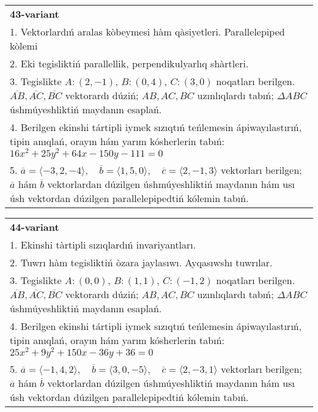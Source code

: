 \documentclass{article}
\begin{document}
\begin{tabular}{m{17cm}}
\textbf{43-variant}\\
1. Vektorlardıń aralas kòbeymesi hàm qàsiyetleri. Parallelepiped kòlemi\\

2. Eki tegisliktiń parallellik, perpendikulyarlıq shàrtleri.\\

3. Tegislikte $A: (2, -1)$, $B: (0, 4)$, $C: (3, 0)$ noqatları berilgen. $\overline{AB}, \overline{AC}, \overline{BC}$ vektorardı dúziń; $AB, AC, BC$ uzınlıqlardı tabıń; $\Delta ABC$ úshmúyeshliktiń maydanın esaplań. \\

4. Berilgen ekinshi tártipli iymek sızıqtıń teńlemesin ápiwayılastırıń, tipin anıqlań, orayın hám yarım kósherlerin tabıń: $16x^2+25y^2+64x-150y-111=0$\\

5. \(\overline{a} = \langle -3, 2, -4 \rangle, \quad \overline{b} = \langle 1, 5, 0 \rangle, \quad \overline{c} = \langle 2, -1, 3 \rangle\) vektorları berilgen; \(\overline{a}\) hám \(\overline{b}\) vektorlardan dúzilgen úshmúyeshliktiń maydanın hám usı úsh vektordan dúzilgen parallelepipedtiń kólemin tabıń.
\end{tabular}
\vspace{1cm}


\begin{tabular}{m{17cm}}
\textbf{44-variant}\\
1. Ekinshi tàrtipli sızıqlardıń invariyantları.\\

2. Tuwrı hàm tegisliktiń òzara jaylasıwı. Ayqasıwshı tuwrılar.\\

3. Tegislikte $A: (0, 0)$, $B: (1, 1)$, $C: (-1, 2)$ noqatları berilgen. $\overline{AB}, \overline{AC}, \overline{BC}$ vektorardı dúziń; $AB, AC, BC$ uzınlıqlardı tabıń; $\Delta ABC$ úshmúyeshliktiń maydanın esaplań. \\

4. Berilgen ekinshi tártipli iymek sızıqtıń teńlemesin ápiwayılastırıń, tipin anıqlań, orayın hám yarım kósherlerin tabıń: $25x^2+9y^2+150x-36y+36=0$\\

5. \(\overline{a} = \langle -1, 4, 2 \rangle, \quad \overline{b} = \langle 3, 0, -5 \rangle, \quad \overline{c} = \langle 2, -3, 1 \rangle\) vektorları berilgen; \(\overline{a}\) hám \(\overline{b}\) vektorlardan dúzilgen úshmúyeshliktiń maydanın hám usı úsh vektordan dúzilgen parallelepipedtiń kólemin tabıń.
\end{tabular}
\vspace{1cm}
\end{document}

